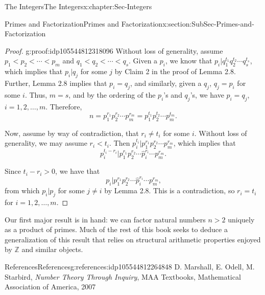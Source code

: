 \documentclass[oneside,10pt,]{book}
\numberwithin{equation}{section}
\def\Z{{\mathbb Z}}
\newcommand{\lt}{<}
\begin{document}
\begin{chapterptx}{The Integers}{}{The Integers}{}{}{x:chapter:Sec-Integers}
\begin{sectionptx}{Primes and Factorization}{}{Primes and Factorization}{}{}{x:section:SubSec-Primes-and-Factorization}
\begin{proof}{}{g:proof:idp105544812318096}
Without loss of generality, assume \(p_1 \lt  p_2 \lt  \cdots \lt  p_m\) and \(q_1 \lt  q_2 \lt  \cdots \lt  q_s\). Given a \(p_i\), we know that \(p_i | q_1^{t_1} q_2^{t_2} \cdots q_s^{t_s}\), which implies that \(p_i | q_j\) for some \(j\) by Claim 2 in the proof of Lemma 2.8. Further, Lemma 2.8 implies that \(p_i = q_j\), and similarly, given a \(q_j\), \(q_j = p_i\) for some \(i\). Thus, \(m =s\), and by the ordering of the \(p_i\)'s and \(q_j\)'s, we have \(p_i = q_j\), \(i = 1, 2, \ldots, m\). Therefore,%
\begin{equation*}
n = p_1^{r_1} p_2^{r_2} \cdots p_m^{r_m} = p_1^{t_1} p_2^{t_2} \cdots p_m^{t_m}\text{.}
\end{equation*}
%
\par
Now, assume by way of contradiction, that \(r_i \ne t_i\) for some \(i\). Without loss of generality, we may assume \(r_i \lt  t_i\). Then \(p_i^{t_i} | p_1^{r_1} p_2^{r_2} \cdots p_m^{r_m}\), which implies that%
\begin{equation*}
p_i^{t_i - r_i} | p_1^{r_1} p_2^{r_2} \cdots \hat{p}_i^{r_i} \cdots p_m^{r_m}\text{.}
\end{equation*}
%
\par
Since \(t_i - r_i > 0\), we have that%
\begin{equation*}
p_i  | p_1^{r_1} p_2^{r_2} \cdots \hat{p}_i^{r_i} \cdots p_m^{r_m}\text{,}
\end{equation*}
from which \(p_i | p_j\) for some \(j\ne i\) by Lemma 2.8. This is a contradiction, so \(r_i = t_i\) for \(i = 1, 2, \ldots, m\).%
\end{proof}
Our first major result is in hand: we can factor natural numbers \(n > 2\) uniquely as a product of primes. Much of the rest of this book seeks to deduce a generalization of this result that relies on structural arithmetic properties enjoyed by \(\Z\) and similar objects.%
%
%
\typeout{************************************************}
\typeout{************************************************}
%
\begin{references-subsection-numberless}{References}{}{References}{}{}{g:references:idp105544812264848}
D. Marshall, E. Odell, M. Starbird, \emph{Number Theory Through Inquiry}, MAA Textbooks, Mathematical Association of America, 2007\end{references-subsection-numberless}
\end{sectionptx}
%
%
\typeout{************************************************}
\typeout{************************************************}

\end{chapterptx}
\end{document}
